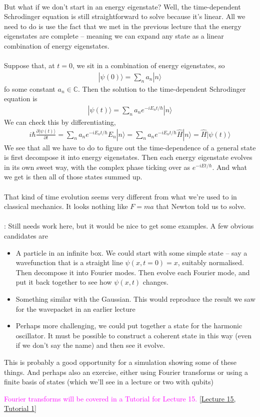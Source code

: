 \documentclass[12pt]{article}
\def\be{\begin{eqnarray}}
\def\ee{\end{eqnarray}}
\newcommand{\nn}{\nonumber}
\newcommand\para{\paragraph{}}
\newcommand{\ppp}[2]{\frac{\partial {#1}}{\partial {#2}}}
\newcommand{\ket}[1]{|#1\rangle}
\newcommand{\co}{\color{olive}}
\newcommand{\cblue}{\color{blue}}
\newcommand{\C}{{\mathds C}}
\newcommand{\alyssa}{\textcolor{magenta}}
\begin{document}
{\para
But what if we don't start in an energy eigenstate? Well, the time-dependent Schrodinger equation is still straightforward to solve because it's linear. All we need to do is use the fact that we met in the previous lecture that the energy eigenstates are complete -- meaning we can expand any state as a linear combination of energy eigenstates.

\para
{\co Suppose that, at $t=0$, we sit in a combination of energy eigenstates, so 
%
\be \ket{\psi(0)} = \sum_n a_n \ket{n}\nn\ee
%
fo some constant $a_n\in\C$. Then the solution to the time-dependent Schrodinger equation is
%
\be \ket{\psi(t)} = \sum_n a_n e^{-i E_nt/\hbar}\ket{n}\nn\ee
%
We can check this by differentiating,
%
\be i\hbar\ppp{\ket{\psi(t)}}{t} = \sum_n a_n e^{-iE_nt/\hbar} E_n \ket{n} = \sum_n a_n  e^{-iE_nt/\hbar}\hat{H}\ket{n} 
= \hat{H}\ket{\psi(t)}\nn\ee
%
} We see that all we have to do to figure out the time-dependence of a general state is first decompose it into energy eigenstates. Then each energy eigenstate evolves in its own sweet way, with the complex phase ticking over as $e^{-iEt/\hbar}$. And what we get is then all of those states summed up.

\para
That kind of time evolution seems very different from what we're used to in classical mechanics. It looks nothing like $F=ma$ that Newton told us to solve.

\para
{\cblue: Still needs work here, but it would be nice to get some examples. A few obvious candidates are
\begin{itemize}
\item A particle in an infinite box. We could start with some simple state -- say a wavefunction that is a straight line $\psi(x,t=0) = x$, suitably normalised. Then decompose it into Fourier modes. Then evolve each Fourier mode, and put it back together to see how $\psi(x,t)$ changes.
\item Something similar with the Gaussian. This would reproduce the result we saw for the wavepacket in an earlier lecture
\item Perhaps more challenging, we could put together a state for the harmonic oscillator. It must be possible to construct a coherent state in this way (even if we don't say the name) and then see it evolve.
\end{itemize}
%
This is probably a good opportunity for a simulation showing some of these things. And perhaps also an exercise, either using Fourier transforms or using a finite basis of states (which we'll see in a lecture or two with qubits)} \alyssa{Fourier transforms will be covered in a Tutorial for Lecture 15.} \href{https://drive.google.com/file/d/1IoUQ40qWqa0JPbx3EQL5RoLQj3zFWbqI/view?usp=drive_link}{[Lecture 15, Tutorial 1]}


}
\end{document}

